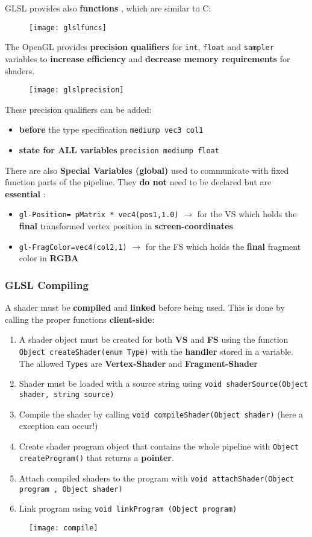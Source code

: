 GLSL provides also \textbf{functions} , which are similar to C:
\begin{figure}[H]
 \centering
 \texttt{[image: glslfuncs]} 
\end{figure} 
The OpenGL provides \textbf{precision qualifiers} for \texttt{int}, \texttt{float} and \texttt{sampler} variables to \textbf{increase efficiency} and \textbf{decrease memory requirements} for shaders.
\begin{figure}[H]
 \centering
 \texttt{[image: glslprecision]} 
\end{figure} 
These precision qualifiers can be added:
\begin{itemize}
\item \textbf{before} the type specification \texttt{mediump vec3 col1}
\item \textbf{state for ALL variables} \texttt{precision mediump float}
\end{itemize}
There are also \textbf{Special Variables (global)} used to communicate with fixed function parts of the pipeline. They \textbf{do not} need to be declared but are \textbf{essential} :
\begin{itemize}
\item \texttt{gl-Position= pMatrix * vec4(pos1,1.0)} $\to$ for the VS which holds the \textbf{final} transformed vertex position in \textbf{screen-coordinates}
\item \texttt{gl-FragColor=vec4(col2,1)} $\to$ for the FS which holds the \textbf{final} fragment color in \textbf{RGBA}
\end{itemize}

\subsubsection{GLSL Compiling}
A shader must be \textbf{compiled} and \textbf{linked} before being used.
This is done by calling the proper functions \textbf{client-side}:
\begin{enumerate}
\item A shader object must be created for both \textbf{VS} and \textbf{FS} using the function \texttt{Object createShader(enum Type)} with the \textbf{handler} stored in a variable. The allowed \texttt{Types} are \textbf{Vertex-Shader} and \textbf{Fragment-Shader}
\item Shader must be loaded with a source string using \texttt{void shaderSource(Object shader, string source)}
\item Compile the shader by calling \texttt{void compileShader(Object shader)} (here a exception can occur!)
\item Create shader program object 	that contains the whole pipeline with \texttt{Object createProgram()} that returns a \textbf{pointer}.
\item Attach compiled shaders to the program with \texttt{void attachShader(Object program , Object shader)}
\item Link program using \texttt{void linkProgram (Object program)}
\end{enumerate}
\begin{figure}[H]
 \centering
 \texttt{[image: compile]} 
\end{figure} 

